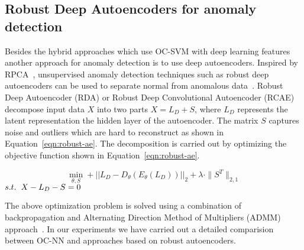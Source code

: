\subsection{Robust Deep Autoencoders for anomaly detection}
Besides the hybrid approaches which use OC-SVM with deep learning features another approach for anomaly detection is to use deep autoencoders.
Inspired by RPCA~\cite{xu2010robust}, unsupervised anomaly detection techniques such as robust deep autoencoders can be used to separate
normal from anomalous data~\cite{zhou2017anomaly,chalapathy2017robust}.
Robust Deep Autoencoder (RDA) or Robust Deep Convolutional Autoencoder (RCAE) decompose input data $X$ into two parts $X = L_D + S$, where $L_D$ represents the latent representation the hidden layer of the autoencoder. The matrix  $S$ captures noise and outliers which are hard to reconstruct as shown in Equation~\ref{eqn:robust-ae}. The decomposition is carried out by optimizing the objective function shown in Equation~\ref{eqn:robust-ae}.

\begin{equation}
	\label{eqn:robust-ae}
	\min_{\theta, S} + ||L_D - D_{\theta}(E_{\theta}(L_D)) ||_{2}+ \lambda \cdot \| S^T \|_{2,1}
\end{equation}
 \hspace{1.8cm}   $s.t. \hspace{0.2cm} X - L_D -S = 0 $



The above optimization problem is solved using a combination of backpropagation and Alternating Direction Method of Multipliers (ADMM) approach~\cite{boyd2004convex}. In our experiments  we have carried out a detailed comparision between OC-NN and approaches based on robust autoencoders.

\begin{comment}
Notice that in the constraint of Equation~\ref{eqn:robust-ae} we split the input data X into two
parts, $L_D$ and $S$. $L_D$ is the input to an autoencoder $D_{\theta}(E_{\theta}(L_D))$ and
we train this autoencoder by minimizing the reconstruction error
 $||L_D - D_{\theta}(E_{\theta}(L_D)) ||_{2}$ through back-propagation. $S$, on the other
hand, contains noise and outliers which are learnt applying proximal methods following Alternating Direction Method of Multipliers (ADMM) ~\cite{boyd2004convex}. While $\lambda$ tuning parameter is selected in a semi-supervised fashion through grid-search for optimal $F1$ score.
RDA could be leveraged to detect anomalies similar to OC-SVM setting. The results obtained using our proposed approach of OC-NN are comparable to the results obtained on anomaly detection task on both MNIST and Cifar-10 datasets, as illustrated in Table~\ref{tbl:mnist-usps-anomaly-results-summary} and Table~\ref{tbl:cifar-10-pfam-anomaly-results-summary}.
\end{comment}

